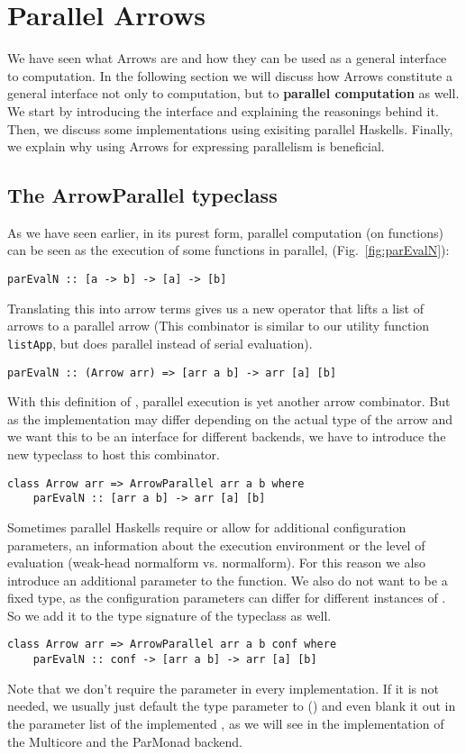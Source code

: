 \section{Parallel Arrows}
\label{sec:parallel-arrows}
We have seen what Arrows are and how they can be used as a general interface to computation. In the following section we will discuss how Arrows constitute a general interface not only to computation, but to \textbf{parallel computation} as well. We start by introducing the interface and explaining the reasonings behind it. Then, we discuss some implementations using exisiting parallel Haskells. Finally, we explain why using Arrows for expressing parallelism is beneficial.
\subsection{The ArrowParallel typeclass}
As we have seen earlier, in its purest form, parallel computation (on functions) can be seen as the execution of some functions  in parallel,  (Fig.~\ref{fig:parEvalN}):
\begin{lstlisting}[frame=htrbl]
parEvalN :: [a -> b] -> [a] -> [b]
\end{lstlisting}
Translating this into arrow terms gives us a new operator  that lifts a list of arrows \code{[arr a b]} to a parallel arrow  (This combinator is similar to our utility function \lstinline{listApp}, but does parallel instead of serial evaluation).
\begin{lstlisting}[frame=htrbl]
parEvalN :: (Arrow arr) => [arr a b] -> arr [a] [b]
\end{lstlisting}
With this definition of , parallel execution is yet another arrow combinator. But as the implementation may differ depending on the actual type of the arrow  and we want this to be an interface for different backends, we have to introduce the new typeclass  to host this combinator.
\begin{lstlisting}[frame=htrbl]
class Arrow arr => ArrowParallel arr a b where
	parEvalN :: [arr a b] -> arr [a] [b]
\end{lstlisting}
Sometimes parallel Haskells require or allow for additional configuration parameters, \eg an information about the execution environment or the level of evaluation (weak-head normalform vs. normalform). For this reason we also introduce an additional  parameter to the function. We also do not want  to be a fixed type, as the configuration parameters can differ for different instances of . So we add it to the type signature of the typeclass as well.
\begin{lstlisting}[frame=htrbl]
class Arrow arr => ArrowParallel arr a b conf where
	parEvalN :: conf -> [arr a b] -> arr [a] [b]
\end{lstlisting}
Note that we don't require the  parameter in every implementation. If it is not needed, we usually just default the  type parameter to () and even blank it out in the parameter list of the implemented , as we will see in the implementation of the Multicore and the ParMonad backend.

